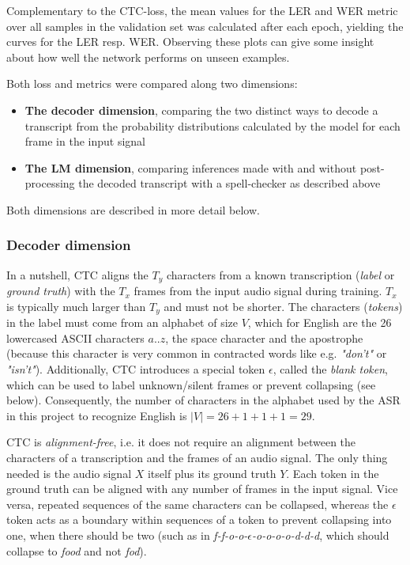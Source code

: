 Complementary to the \ac{CTC}-loss, the mean values for the \ac{LER} and \ac{WER} metric over all samples in the validation set was calculated after each epoch, yielding the curves for the \ac{LER} resp. \ac{WER}. Observing these plots can give some insight about how well the network performs on unseen examples.

Both loss and metrics were compared along two dimensions:

\begin{itemize}
	\item \textbf{The decoder dimension}, comparing the two distinct ways to decode a transcript from the probability distributions calculated by the model for each frame in the input signal
	\item \textbf{The LM dimension}, comparing inferences made with and without post-processing the decoded transcript with a spell-checker as described above
\end{itemize}

Both dimensions are described in more detail below.

\subsubsection{Decoder dimension}

In a nutshell, \ac{CTC} aligns the $T_y$ characters from a known transcription (\textit{label} or \textit{ground truth}) with the $T_x$ frames from the input audio signal during training. $T_x$ is typically much larger than $T_y$ and must not be shorter. The characters (\textit{tokens}) in the label must come from an alphabet of size $V$, which for English are the 26 lowercased ASCII characters $a..z$, the space character and the apostrophe (because this character is very common in contracted words like e.g. \textit{"don't"} or \textit{"isn't"}). Additionally, \ac{CTC} introduces a special token $\epsilon$, called the \textit{blank token}, which can be used to label unknown/silent frames or prevent collapsing (see below). Consequently, the number of characters in the alphabet used by the \ac{ASR} in this project to recognize English is $|V|=26+1+1+1=29$.

\ac{CTC} is \textit{alignment-free}, i.e. it does not require an alignment between the characters of a transcription and the frames of an audio signal. The only thing needed is the audio signal $X$ itself plus its ground truth $Y$. Each token in the ground truth can be aligned with any number of frames in the input signal. Vice versa, repeated sequences of the same characters can be collapsed, whereas the $\epsilon$ token acts as a boundary within sequences of a token to prevent collapsing into one, when there should be two (such as in \textit{f-f-o-o-$\epsilon$-o-o-o-o-d-d-d}, which should collapse to \textit{food} and not \textit{fod}). 

